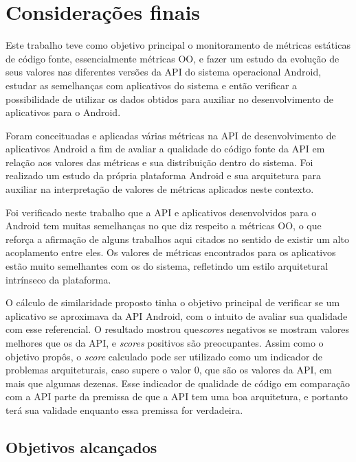 \chapter{Considerações finais}
\label{consideracoes-finais}

Este trabalho teve como objetivo principal o monitoramento de métricas estáticas de código fonte, essencialmente métricas OO, e fazer um estudo da evolução de seus valores nas diferentes versões da API do sistema operacional Android, estudar as semelhanças com aplicativos do sistema e então verificar a possibilidade de utilizar os dados obtidos para auxiliar no desenvolvimento de aplicativos para o Android.

Foram conceituadas e aplicadas várias métricas na API de desenvolvimento de aplicativos Android a fim de avaliar a qualidade do código fonte da API em relação aos valores das métricas e sua distribuição dentro do sistema. Foi realizado um estudo da própria plataforma Android e sua arquitetura para auxiliar na interpretação de valores de métricas aplicados neste contexto. 

Foi verificado neste trabalho que a API e aplicativos desenvolvidos para o Android tem muitas semelhanças no que diz respeito a métricas OO, o que reforça a afirmação de alguns trabalhos aqui citados no sentido de existir um alto acoplamento entre eles. Os valores de métricas encontrados para os aplicativos estão muito semelhantes com os do sistema, refletindo um estilo arquitetural intrínseco da plataforma.

O cálculo de similaridade proposto tinha o objetivo principal de verificar se um aplicativo se aproximava da API Android, com o intuito de avaliar sua qualidade com esse referencial. O resultado mostrou que\textit{scores} negativos se mostram valores melhores que os da API, e \textit{scores} positivos são preocupantes. Assim como o objetivo propôs, o \textit{score} calculado pode ser utilizado como um indicador de problemas arquiteturais, caso supere o valor 0, que são os valores da API, em mais que algumas dezenas. Esse indicador de qualidade de código em comparação com a API parte da premissa de que a API tem uma boa arquitetura, e portanto terá sua validade enquanto essa premissa for verdadeira.

\section{Objetivos alcançados}

